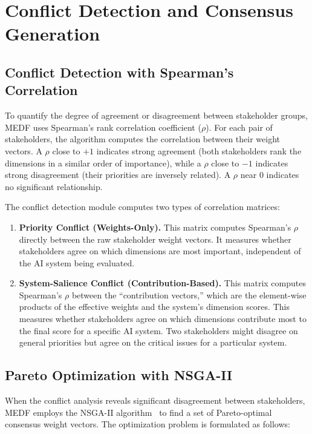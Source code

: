 \section{Conflict Detection and Consensus Generation}
\label{sec:conflict}

\subsection{Conflict Detection with Spearman's Correlation}
\label{sec:spearman}

To quantify the degree of agreement or disagreement between stakeholder groups, MEDF uses Spearman's rank correlation coefficient ($\rho$). For each pair of stakeholders, the algorithm computes the correlation between their weight vectors. A $\rho$ close to $+1$ indicates strong agreement (both stakeholders rank the dimensions in a similar order of importance), while a $\rho$ close to $-1$ indicates strong disagreement (their priorities are inversely related). A $\rho$ near $0$ indicates no significant relationship.

The conflict detection module computes two types of correlation matrices:

\begin{enumerate}[leftmargin=2em]
  \item \textbf{Priority Conflict (Weights-Only).} This matrix computes Spearman's $\rho$ directly between the raw stakeholder weight vectors. It measures whether stakeholders agree on which dimensions are most important, independent of the AI system being evaluated.

  \item \textbf{System-Salience Conflict (Contribution-Based).} This matrix computes Spearman's $\rho$ between the \enquote{contribution vectors,} which are the element-wise products of the effective weights and the system's dimension scores. This measures whether stakeholders agree on which dimensions contribute most to the final score for a specific AI system. Two stakeholders might disagree on general priorities but agree on the critical issues for a particular system.
\end{enumerate}

\subsection{Pareto Optimization with NSGA-II}
\label{sec:pareto}

When the conflict analysis reveals significant disagreement between stakeholders, MEDF employs the NSGA-II algorithm~\cite{deb2002nsga2} to find a set of Pareto-optimal consensus weight vectors. The optimization problem is formulated as follows:

